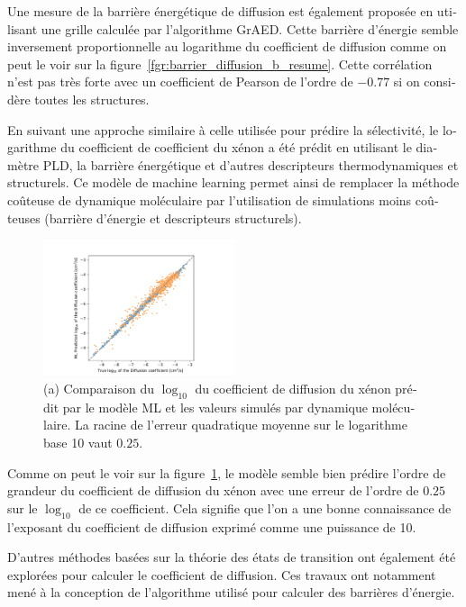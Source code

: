 \documentclass[thesis]{subfiles}
\begin{document}
\begin{otherlanguage}{french}
Une mesure de la barrière énergétique de diffusion est également proposée en utilisant une grille calculée par l'algorithme GrAED. Cette barrière d'énergie semble inversement proportionnelle au logarithme du coefficient de diffusion comme on peut le voir sur la figure~\ref{fgr:barrier_diffusion_b_resume}. Cette corrélation n'est pas très forte avec un coefficient de Pearson de l'ordre de $-0.77$ si on considère toutes les structures. 

En suivant une approche similaire à celle utilisée pour prédire la sélectivité, le logarithme du coefficient de coefficient du xénon a été prédit en utilisant le diamètre PLD, la barrière énergétique et d'autres descripteurs thermodynamiques et structurels. Ce modèle de machine learning permet ainsi de remplacer la méthode coûteuse de dynamique moléculaire par l'utilisation de simulations moins coûteuses (barrière d'énergie et descripteurs structurels). 

\begin{figure}[ht]
  \centering
  \includegraphics[width=0.5\textwidth]{figures/5-diffusion/diffusion_prediction.pdf}
  \caption{ (a) Comparaison du $\log_{10}$ du coefficient de diffusion du xénon prédit par le modèle ML et les valeurs simulés par dynamique moléculaire. La racine de l'erreur quadratique moyenne sur le logarithme base 10 vaut $0.25$. }\label{fgr:diff_pred_resume}
\end{figure}

Comme on peut le voir sur la figure~\ref{fgr:diff_pred_resume}, le modèle semble bien prédire l'ordre de grandeur du coefficient de diffusion du xénon avec une erreur de l'ordre de $0.25$ sur le $\log_{10}$ de ce coefficient. Cela signifie que l'on a une bonne connaissance de l'exposant du coefficient de diffusion exprimé comme une puissance de 10. 

D'autres méthodes basées sur la théorie des états de transition ont également été explorées pour calculer le coefficient de diffusion. Ces travaux ont notamment mené  à la conception de l'algorithme utilisé pour calculer des barrières d'énergie. 


\end{otherlanguage}
\end{document}
